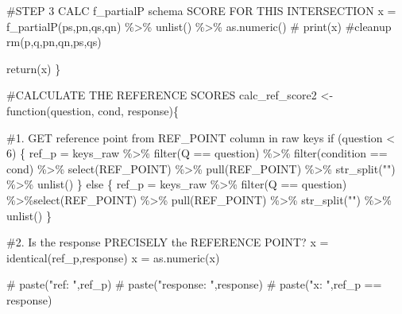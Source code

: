 \documentclass[
  letterpaper,
  DIV=11,
  numbers=noendperiod]{scrreprt}
\newenvironment{Shaded}{\begin{snugshade}}{\end{snugshade}}
\newcommand{\CommentTok}[1]{\textcolor[rgb]{0.37,0.37,0.37}{#1}}
\newcommand{\ControlFlowTok}[1]{\textcolor[rgb]{0.00,0.23,0.31}{#1}}
\newcommand{\DecValTok}[1]{\textcolor[rgb]{0.68,0.00,0.00}{#1}}
\newcommand{\FunctionTok}[1]{\textcolor[rgb]{0.28,0.35,0.67}{#1}}
\newcommand{\NormalTok}[1]{\textcolor[rgb]{0.00,0.23,0.31}{#1}}
\newcommand{\OtherTok}[1]{\textcolor[rgb]{0.00,0.23,0.31}{#1}}
\newcommand{\SpecialCharTok}[1]{\textcolor[rgb]{0.37,0.37,0.37}{#1}}
\newcommand{\StringTok}[1]{\textcolor[rgb]{0.13,0.47,0.30}{#1}}
\begin{document}
\begin{Shaded}
\begin{Highlighting}[]
  \CommentTok{\#STEP 3 CALC f\_partialP schema SCORE FOR THIS INTERSECTION}
\NormalTok{  x }\OtherTok{=} \FunctionTok{f\_partialP}\NormalTok{(ps,pn,qs,qn) }\SpecialCharTok{\%\textgreater{}\%} \FunctionTok{unlist}\NormalTok{() }\SpecialCharTok{\%\textgreater{}\%} \FunctionTok{as.numeric}\NormalTok{()}
  \CommentTok{\# print(x)}
  \CommentTok{\#cleanup}
  \FunctionTok{rm}\NormalTok{(p,q,pn,qn,ps,qs)}

  \FunctionTok{return}\NormalTok{(x)}
\NormalTok{\}}

\CommentTok{\#CALCULATE THE REFERENCE SCORES}
\NormalTok{calc\_ref\_score2 }\OtherTok{\textless{}{-}} \ControlFlowTok{function}\NormalTok{(question, cond, response)\{}
  
  \CommentTok{\#1. GET reference point from REF\_POINT column in raw keys}
  \ControlFlowTok{if}\NormalTok{ (question }\SpecialCharTok{\textless{}} \DecValTok{6}\NormalTok{) \{}
\NormalTok{    ref\_p }\OtherTok{=}\NormalTok{ keys\_raw }\SpecialCharTok{\%\textgreater{}\%} \FunctionTok{filter}\NormalTok{(Q }\SpecialCharTok{==}\NormalTok{ question) }\SpecialCharTok{\%\textgreater{}\%} \FunctionTok{filter}\NormalTok{(condition }\SpecialCharTok{==}\NormalTok{ cond) }\SpecialCharTok{\%\textgreater{}\%} \FunctionTok{select}\NormalTok{(REF\_POINT) }\SpecialCharTok{\%\textgreater{}\%} \FunctionTok{pull}\NormalTok{(REF\_POINT) }\SpecialCharTok{\%\textgreater{}\%} \FunctionTok{str\_split}\NormalTok{(}\StringTok{""}\NormalTok{) }\SpecialCharTok{\%\textgreater{}\%} \FunctionTok{unlist}\NormalTok{()}
\NormalTok{  \} }\ControlFlowTok{else}\NormalTok{ \{}
\NormalTok{    ref\_p }\OtherTok{=}\NormalTok{ keys\_raw }\SpecialCharTok{\%\textgreater{}\%} \FunctionTok{filter}\NormalTok{(Q }\SpecialCharTok{==}\NormalTok{ question) }\SpecialCharTok{\%\textgreater{}\%}\FunctionTok{select}\NormalTok{(REF\_POINT) }\SpecialCharTok{\%\textgreater{}\%} 
      \FunctionTok{pull}\NormalTok{(REF\_POINT) }\SpecialCharTok{\%\textgreater{}\%} \FunctionTok{str\_split}\NormalTok{(}\StringTok{""}\NormalTok{) }\SpecialCharTok{\%\textgreater{}\%} \FunctionTok{unlist}\NormalTok{()}
\NormalTok{  \}}
    
    \CommentTok{\#2. Is the response PRECISELY the REFERENCE POINT?}
\NormalTok{    x }\OtherTok{=} \FunctionTok{identical}\NormalTok{(ref\_p,response)}
\NormalTok{    x }\OtherTok{=} \FunctionTok{as.numeric}\NormalTok{(x)  }
  
    \CommentTok{\# paste("ref: ",ref\_p)}
    \CommentTok{\# paste("response: ",response)}
    \CommentTok{\# paste("x: ",ref\_p == response)}
    

\end{Highlighting}
\end{Shaded}
\end{document}
